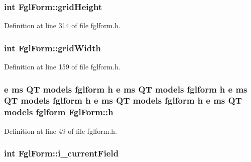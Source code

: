 \hypertarget{classFglForm_a9dc5de78bd4b0d7024831926f9cdc7d9}{
\subsubsection[{gridHeight}]{\setlength{\rightskip}{0pt plus 5cm}int {\bf FglForm::gridHeight}}}
\label{classFglForm_a9dc5de78bd4b0d7024831926f9cdc7d9}


Definition at line 314 of file fglform.h.

\hypertarget{classFglForm_a34347fff01950e4574b64c69b62d1ff2}{
\subsubsection[{gridWidth}]{\setlength{\rightskip}{0pt plus 5cm}int {\bf FglForm::gridWidth}}}
\label{classFglForm_a34347fff01950e4574b64c69b62d1ff2}


Definition at line 159 of file fglform.h.

\hypertarget{classFglForm_a2adf651bccc4bd01a985a0c5bde45af7}{
\subsubsection[{h}]{\setlength{\rightskip}{0pt plus 5cm}e ms QT models fglform {\bf h} e ms QT models fglform {\bf h} e ms QT models fglform {\bf h} e ms QT models fglform {\bf h} e ms QT models fglform {\bf FglForm::h}}}
\label{classFglForm_a2adf651bccc4bd01a985a0c5bde45af7}


Definition at line 49 of file fglform.h.

\hypertarget{classFglForm_ae7e903902c63ce3179656df4b684038f}{
\subsubsection[{i\_\-currentField}]{\setlength{\rightskip}{0pt plus 5cm}int {\bf FglForm::i\_\-currentField}}}
\label{classFglForm_ae7e903902c63ce3179656df4b684038f}


